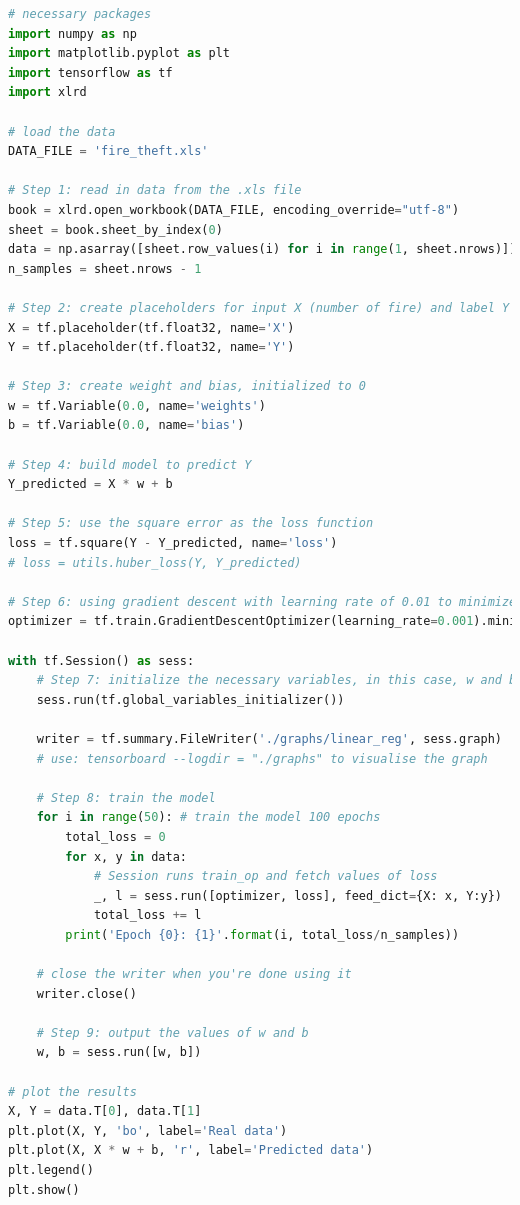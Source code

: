 \documentclass{article}
\begin{document}
\begin{lstlisting}[language=Python,morekeywords ={as}]
# necessary packages
import numpy as np
import matplotlib.pyplot as plt
import tensorflow as tf
import xlrd

# load the data
DATA_FILE = 'fire_theft.xls'

# Step 1: read in data from the .xls file
book = xlrd.open_workbook(DATA_FILE, encoding_override="utf-8")
sheet = book.sheet_by_index(0)
data = np.asarray([sheet.row_values(i) for i in range(1, sheet.nrows)])
n_samples = sheet.nrows - 1

# Step 2: create placeholders for input X (number of fire) and label Y (number of theft)
X = tf.placeholder(tf.float32, name='X')
Y = tf.placeholder(tf.float32, name='Y')

# Step 3: create weight and bias, initialized to 0
w = tf.Variable(0.0, name='weights')
b = tf.Variable(0.0, name='bias')

# Step 4: build model to predict Y
Y_predicted = X * w + b 

# Step 5: use the square error as the loss function
loss = tf.square(Y - Y_predicted, name='loss')
# loss = utils.huber_loss(Y, Y_predicted)

# Step 6: using gradient descent with learning rate of 0.01 to minimize loss
optimizer = tf.train.GradientDescentOptimizer(learning_rate=0.001).minimize(loss)

with tf.Session() as sess:
	# Step 7: initialize the necessary variables, in this case, w and b
	sess.run(tf.global_variables_initializer()) 
	
	writer = tf.summary.FileWriter('./graphs/linear_reg', sess.graph)
	# use: tensorboard --logdir = "./graphs" to visualise the graph	
	
	# Step 8: train the model
	for i in range(50): # train the model 100 epochs
		total_loss = 0
		for x, y in data:
			# Session runs train_op and fetch values of loss
			_, l = sess.run([optimizer, loss], feed_dict={X: x, Y:y}) 
			total_loss += l
		print('Epoch {0}: {1}'.format(i, total_loss/n_samples))

	# close the writer when you're done using it
	writer.close() 
	
	# Step 9: output the values of w and b
	w, b = sess.run([w, b]) 

# plot the results
X, Y = data.T[0], data.T[1]
plt.plot(X, Y, 'bo', label='Real data')
plt.plot(X, X * w + b, 'r', label='Predicted data')
plt.legend()
plt.show()
\end{lstlisting}
\end{document}

